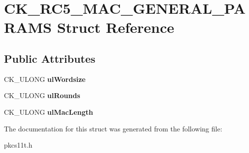 \hypertarget{struct_c_k___r_c5___m_a_c___g_e_n_e_r_a_l___p_a_r_a_m_s}{}\section{C\+K\+\_\+\+R\+C5\+\_\+\+M\+A\+C\+\_\+\+G\+E\+N\+E\+R\+A\+L\+\_\+\+P\+A\+R\+A\+MS Struct Reference}
\label{struct_c_k___r_c5___m_a_c___g_e_n_e_r_a_l___p_a_r_a_m_s}
\subsection*{Public Attributes}
\begin{DoxyCompactItemize}
\item 
\mbox{\label{struct_c_k___r_c5___m_a_c___g_e_n_e_r_a_l___p_a_r_a_m_s_ab5c8eda50a02ba6eb5f418be440f2f16}} 
C\+K\+\_\+\+U\+L\+O\+NG {\bfseries ul\+Wordsize}
\item 
\mbox{\label{struct_c_k___r_c5___m_a_c___g_e_n_e_r_a_l___p_a_r_a_m_s_a4159d1166521a81e37d733545e4fa33a}} 
C\+K\+\_\+\+U\+L\+O\+NG {\bfseries ul\+Rounds}
\item 
\mbox{\label{struct_c_k___r_c5___m_a_c___g_e_n_e_r_a_l___p_a_r_a_m_s_a31039f2bba7398cc408c830a3b6010e8}} 
C\+K\+\_\+\+U\+L\+O\+NG {\bfseries ul\+Mac\+Length}
\end{DoxyCompactItemize}


The documentation for this struct was generated from the following file\+:\begin{DoxyCompactItemize}
\item 
pkcs11t.\+h\end{DoxyCompactItemize}
